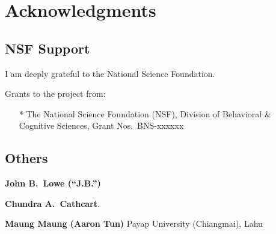 \vspace{0.25em}

\chapter*{Acknowledgments}

\renewcommand{\thefootnote}{\arabic{footnote}}
\setcounter{footnote}{0}

\section{NSF Support}

I am deeply grateful to the National Science Foundation.

Grants to the project from:

\begin{itemize}
\item[*] The National Science Foundation (NSF), Division of
  Behavioral \& Cognitive Sciences, Grant Nos.\ BNS-xxxxxx
\end{itemize}

\section{Others}

\textbf{John B.\ Lowe (“J.B.”)} 

\textbf{Chundra A.\ Cathcart}. 

\textbf{Maung Maung (Aaron Tun)} Payap University (Chiangmai), Lahu


